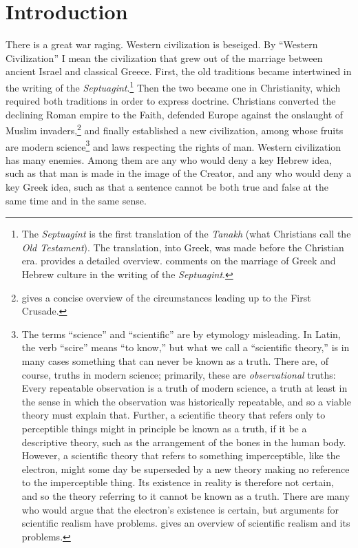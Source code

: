 \documentclass[twocolumn]{article}
\begin{document}
\thispagestyle{fancy}

\section{Introduction}

There is a great war raging.  Western civilization is beseiged.  By ``Western
Civilization'' I mean the civilization that grew out of the marriage between
ancient Israel and classical Greece.  First, the old traditions became
intertwined in the writing of the {\it Septuagint}.\footnote{%
   The {\it Septuagint} is the first translation of the {\it Tanakh} (what
   Christians call the {\it Old Testament}).  The translation, into Greek, was
   made before the Christian era.  \cite{vdh1912} provides a detailed overview.
   \cite{r2005, r2007} comments on the marriage of Greek and Hebrew culture in
   the writing of the {\it Septuagint}.
}
Then the two became one in Christianity, which required both traditions in
order to express doctrine.  Christians converted the declining Roman empire to
the Faith, defended Europe against the onslaught of Muslim invaders,\footnote{%
   \citet[Chapter 4]{b1938} gives a concise overview of the circumstances
   leading up to the First Crusade.
}
and finally established a new civilization, among whose fruits are modern
science\footnote{%
   The terms ``science'' and ``scientific'' are by etymology misleading.  In
   Latin, the verb ``scire'' means ``to know,'' but what we call a ``scientific
   theory,'' is in many cases something that can never be known as a truth.
   There are, of course, truths in modern science; primarily, these are
   \emph{observational} truths: Every repeatable observation is a truth of
   modern science, a truth at least in the sense in which the observation was
   historically repeatable, and so a viable theory must explain that.  Further,
   a scientific theory that refers only to perceptible things might in
   principle be known as a truth, if it be a descriptive theory, such as the
   arrangement of the bones in the human body.  However, a scientific theory
   that refers to something imperceptible, like the electron, might some day be
   superseded by a new theory making no reference to the imperceptible thing.
   Its existence in reality is therefore not certain, and so the theory
   referring to it cannot be known as a truth.  There are many who would argue
   that the electron's existence is certain, but arguments for scientific
   realism have problems. \cite{c2016} gives an overview of scientific realism
   and its problems.%
}
and laws respecting the rights of man.  Western civilization has many enemies.
Among them are any who would deny a key Hebrew idea, such as that man is made
in the image of the Creator, and any who would deny a key Greek idea, such as
that a sentence cannot be both true and false at the same time and in the same
sense.
\end{document}

